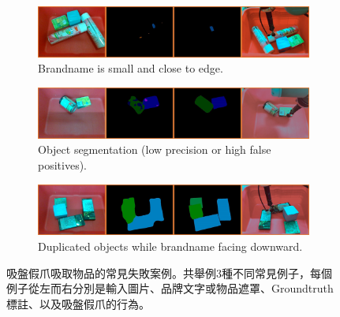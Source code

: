 \begin{figure}
  \centering
  \begin{subfigure}[b]{0.8\textwidth}
    \includegraphics[width=\textwidth]{./figures/5_obj_8_suction_fail_2.jpg}
    \caption{Brandname is small and close to edge.}
    \label{fig:cylinder_suction_fail}
  \end{subfigure}
  \begin{subfigure}[b]{0.8\textwidth}
    \includegraphics[width=\textwidth]{./figures/5_obj_13_suction_fail_3.jpg}
    \caption{Object segmentation (low precision or high false positives).}
    \label{fig:cuboid_suction_fail}
  \end{subfigure}
  \begin{subfigure}[b]{0.8\textwidth}
    \includegraphics[width=\textwidth]{./figures/5_obj_14_suction_fail_1.jpg}
    \caption{Duplicated objects while brandname facing downward.}
    \label{fig:adjacent_suction_fail}
  \end{subfigure}
  \caption{吸盤假爪吸取物品的常見失敗案例。共舉例3種不同常見例子，每個例子從左而右分別是輸入圖片、品牌文字或物品遮罩、Groundtruth標註、以及吸盤假爪的行為。
}
  \label{fig:failure}
\end{figure}
